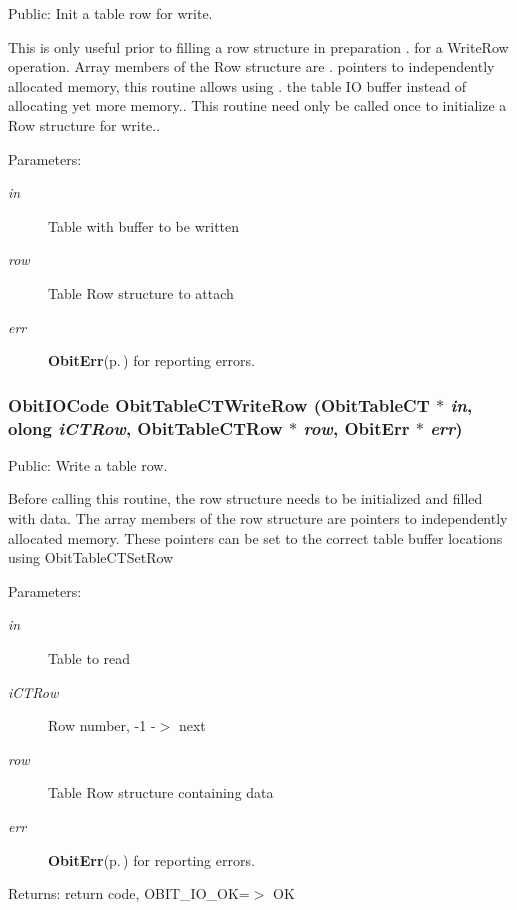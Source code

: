 Public: Init a table row for write. 

This is only useful prior to filling a row structure in preparation . for a Write\-Row operation. Array members of the Row structure are . pointers to independently allocated memory, this routine allows using . the table IO buffer instead of allocating yet more memory.. This routine need only be called once to initialize a Row structure for write.. \begin{Desc}
\item[Parameters:]
\begin{description}
\item[{\em in}]Table with buffer to be written \item[{\em row}]Table Row structure to attach \item[{\em err}]{\bf Obit\-Err}{\rm (p.\,\pageref{structObitErr})} for reporting errors. \end{description}
\end{Desc}
\subsubsection{\setlength{\rightskip}{0pt plus 5cm}Obit\-IOCode Obit\-Table\-CTWrite\-Row ({\bf Obit\-Table\-CT} $\ast$ {\em in}, {\bf olong} {\em i\-CTRow}, {\bf Obit\-Table\-CTRow} $\ast$ {\em row}, {\bf Obit\-Err} $\ast$ {\em err})}\label{ObitTableCT_8h_a20}


Public: Write a table row. 

Before calling this routine, the row structure needs to be initialized and filled with data. The array members of the row structure are pointers to independently allocated memory. These pointers can be set to the correct table buffer locations using Obit\-Table\-CTSet\-Row \begin{Desc}
\item[Parameters:]
\begin{description}
\item[{\em in}]Table to read \item[{\em i\-CTRow}]Row number, -1 -$>$ next \item[{\em row}]Table Row structure containing data \item[{\em err}]{\bf Obit\-Err}{\rm (p.\,\pageref{structObitErr})} for reporting errors. \end{description}
\end{Desc}
\begin{Desc}
\item[Returns:]return code, OBIT\_\-IO\_\-OK=$>$ OK \end{Desc}
